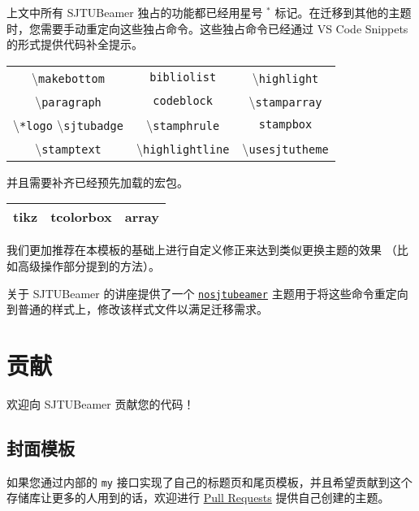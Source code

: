 \documentclass[
    UTF8,
    heading=true,
    12pt,
    a4paper
]{ctexrep}
\newcommand{\cmd}[1]{\textbackslash{}\texttt{#1}}
\newcommand{\cls}[1]{\texttt{#1}}
\newcommand{\env}[1]{\texttt{#1}}
\newcommand{\opt}[1]{\texttt{#1}}
\def\themename{\textsf{SJTUBeamer}}
\begin{document}
上文中所有 \themename{} 独占的功能都已经用星号 $^*$
标记。在迁移到其他的主题时，您需要手动重定向这些独占命令。这些独占命令已经通过 VS Code
Snippets 的形式提供代码补全提示。

\begin{table}[h]
  \centering
  \begin{tabular}{ccc}
    \hline
    \cmd{makebottom}            &
    \env{bibliolist}            & \cmd{highlight}
    \\
    \cmd{paragraph}             & \env{codeblock}
                                &
    \cmd{stamparray}
    \\
    \cmd{*logo} \cmd{sjtubadge} &
    \cmd{stamphrule}            & \env{stampbox}
    \\
    \cmd{stamptext}             &
    \cmd{highlightline}         &
    \cmd{usesjtutheme}
    \\
    \hline
  \end{tabular}
\end{table}

并且需要补齐已经预先加载的宏包。

\begin{table}[h]
  \centering

  \begin{tabular}
    {>{\sffamily}c>{\sffamily}c>{\sffamily}c}
    \hline
    tikz & tcolorbox & array \\
    \hline
  \end{tabular}
\end{table}

我们更加推荐在本模板的基础上进行自定义修正来达到类似更换主题的效果
（比如高级操作部分提到的方法）。

关于 \themename{} 的讲座提供了一个
\href{https://github.com/sjtug/sjtulib-latex-talk/blob/logcreative-2022/beamerthemenosjtubeamer.sty}
{\cls{nosjtubeamer}}
主题用于将这些命令重定向到普通的样式上，修改该样式文件以满足迁移需求。

\chapter{贡献}

欢迎向 \themename{} 贡献您的代码！

\section{封面模板}

如果您通过内部的 \opt{my}
接口实现了自己的标题页和尾页模板，并且希望贡献到这个存储库让更多的人用到的话，欢迎进行
\href{https://github.com/sjtug/SJTUBeamer/pulls}{Pull Requests}
提供自己创建的主题。
\end{document}
